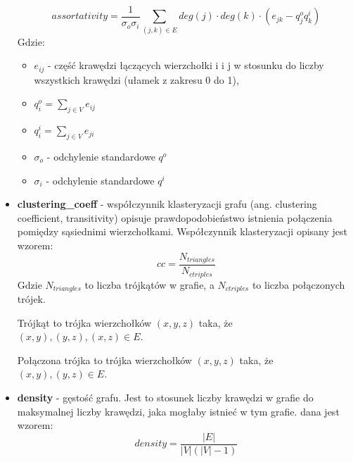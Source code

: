 \begin{itemize}
      \begin{equation}
            \label{eq:assortativity}
            assortativity = \frac{1}{\sigma_o \sigma_i} \sum_{(j,k)\in{E}} deg(j) \cdot deg(k) \cdot (e_{jk} - q_j^o q_k^i)
      \end{equation}      
      Gdzie:
            \begin{itemize}
                  \item $e_{ij}$ - część krawędzi łączących wierzchołki i i j w stosunku do liczby wszystkich krawędzi (ułamek z zakresu 0 do 1),
                  \item $q_i^o = \sum_{j \in V} e_{ij}$
                  \item $q_i^i = \sum_{j \in V} e_{ji}$
                  \item $\sigma_o$ - odchylenie standardowe $q^o$
                  \item $\sigma_i$ - odchylenie standardowe $q^i$
            \end{itemize}
      \item \textbf{clustering\_coeff} - współczynnik klasteryzacji grafu (ang. clustering coefficient, transitivity) opisuje prawdopodobieństwo istnienia połączenia pomiędzy sąsiednimi wierzchołkami.
            Współczynnik klasteryzacji opisany jest wzorem:
            $$cc = \frac{N_{triangles}}{N_{ctriples}}$$
            Gdzie $N_{triangles}$ to liczba trójkątów w grafie, a $N_{ctriples}$ to liczba połączonych trójek.

            Trójkąt to trójka wierzchołków $(x,y,z)$ taka, że $(x,y), (y,z), (x,z) \in E$.

            Połączona trójka to trójka wierzchołków $(x,y,z)$ taka, że $(x,y), (y,z) \in E$.

      \item \textbf{density} - gęstość grafu. Jest to stosunek liczby krawędzi w grafie do maksymalnej liczby krawędzi, jaka mogłaby istnieć w tym grafie.
            dana jest wzorem:
            $$density = \frac{|E|}{|V|(|V|-1)}$$


\end{itemize}
